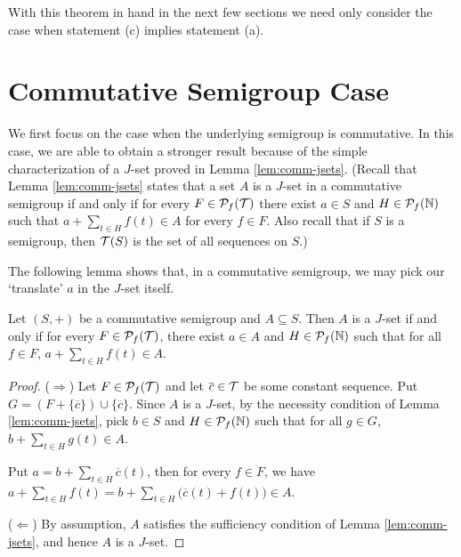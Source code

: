 With this theorem in hand in the next few sections we need only consider the case when statement (c) implies statement (a).

\section{Commutative Semigroup Case}
We first focus on the case when the underlying semigroup is commutative. 
In this case, we are able to obtain a stronger result because of the simple characterization of a $J$-set proved in Lemma \ref{lem:comm-jsets}.
(Recall that Lemma \ref{lem:comm-jsets} states that a set $A$ is a $J$-set in a commutative semigroup if and only if for every $F \in \mathcal{P}_f(\mathcal{T})$ there exist $a \in S$ and $H \in \mathcal{P}_f(\mathbb{N})$ such that $a + \sum_{t \in H} f(t) \in A$ for every $f \in F$.
Also recall that if $S$ is a semigroup, then $\mathcal{T}(S)$ is the set of all sequences on $S$.)


The following lemma shows that, in a commutative semigroup, we may pick our `translate' $a$ in the $J$-set itself.
\begin{lem}
  \label{lem:comm-trans}
  Let $(S, +)$ be a commutative semigroup and $A \subseteq S$.
  Then $A$ is a $J$-set if and only if for every $F \in \mathcal{P}_f(\mathcal{T})$, there exist $a \in A$ and $H \in \mathcal{P}_f(\mathbb{N})$ such that for all $f \in F$, $a + \sum_{t \in H} f(t) \in A$.
\end{lem}
\begin{proof}
  ($\Rightarrow$)
  Let $F \in \mathcal{P}_f(\mathcal{T})$ and let $\overline{c} \in \mathcal{T}$ be some constant sequence.
  Put $G = (F + \{\overline{c}\}) \cup \{\overline{c}\}$. 
  Since $A$ is a $J$-set, by the necessity condition of Lemma \ref{lem:comm-jsets}, pick $b \in S$ and $H \in \mathcal{P}_f(\mathbb{N})$ such that for all $g \in G$, $b + \sum_{t \in H} g(t) \in A$. 

  Put $a = b + \sum_{t \in H} \overline{c}(t)$, then for every $f \in F$, we have $a + \sum_{t \in H} f(t) = b + \sum_{t \in H}\bigl( \overline{c}(t) + f(t) \bigr) \in A$. 
  
  ($\Leftarrow$)
  By assumption, $A$ satisfies the sufficiency condition of Lemma \ref{lem:comm-jsets}, and hence $A$ is a $J$-set.
\end{proof}

